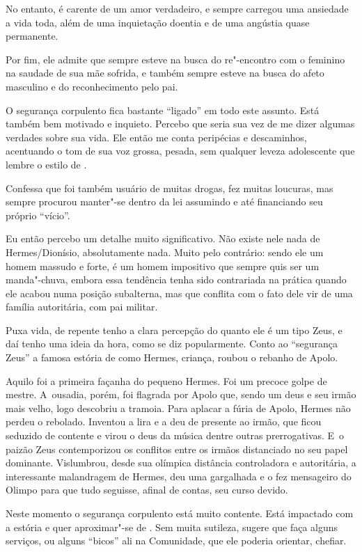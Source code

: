 No entanto,  é carente de um amor verdadeiro, e sempre carregou uma
ansiedade a vida toda, além de uma inquietação doentia e de uma angústia
quase permanente.

Por fim, ele admite que sempre esteve na busca do re"-encontro com o
feminino na saudade de sua mãe sofrida, e também sempre esteve na busca
do afeto masculino e do reconhecimento pelo pai.

\asterisc{}

O segurança corpulento fica bastante ``ligado'' em todo este assunto.
Está também bem motivado e inquieto. Percebo que seria sua vez de me
dizer algumas verdades sobre sua vida. Ele então me conta peripécias e
descaminhos, acentuando o tom de sua voz grossa, pesada, sem qualquer
leveza adolescente que lembre o estilo de .

Confessa que foi também usuário de muitas drogas, fez muitas loucuras,
mas sempre procurou manter"-se dentro da lei assumindo e até financiando
seu próprio ``vício''.

Eu então percebo um detalhe muito significativo. Não existe nele nada de
Hermes/Dionísio, absolutamente nada. Muito pelo contrário: sendo ele um
homem massudo e forte, é um homem impositivo que sempre quis ser um
manda"-chuva, embora essa tendência tenha sido contrariada na prática
quando ele acabou numa posição subalterna, mas que conflita com o fato
dele vir de uma família autoritária, com pai militar.

Puxa vida, de repente tenho a clara percepção do quanto ele é um tipo
Zeus, e daí tenho uma ideia da hora, como se diz popularmente. Conto ao
``segurança Zeus'' a famosa estória de como Hermes, criança, roubou o
rebanho de Apolo.

Aquilo foi a primeira façanha do pequeno Hermes. Foi um precoce golpe de
mestre. A~ousadia, porém, foi flagrada por Apolo que, sendo um deus e
seu irmão mais velho, logo descobriu a tramoia. Para aplacar a fúria de
Apolo, Hermes não perdeu o rebolado. Inventou a lira e a deu de presente
ao irmão, que ficou seduzido de contente e virou o deus da música dentre
outras prerrogativas. E~o paizão Zeus contemporizou os conflitos entre
os irmãos distanciado no seu papel dominante. Vislumbrou, desde sua
olímpica distância controladora e autoritária, a interessante
malandragem de Hermes, deu uma gargalhada e o fez mensageiro do Olimpo
para que tudo seguisse, afinal de contas, seu curso devido.

Neste momento o segurança corpulento está muito contente. Está impactado
com a estória e quer aproximar"-se de . Sem muita sutileza, sugere que
 faça alguns serviços, ou alguns ``bicos'' ali na Comunidade, que ele
poderia orientar, chefiar.

